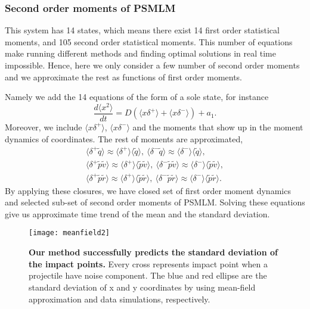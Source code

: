 \documentclass[letterpaper, 10 pt, conference]{ieeeconf}  %
\begin{document}
\subsubsection{Second order moments of PSMLM}
This system has 14 states, which means there exist 14 first order statistical moments, and 105 second order statistical moments. This number of equations make running different methods and finding optimal solutions in real time impossible. Hence, here we only consider a few number of second order moments and we approximate the rest as functions of first order moments. 

Namely we add the 14 equations of the form of a sole state, for instance
\begin{equation}
\frac{d \langle x^2 \rangle}{dt}= D ( \langle x \delta^+ \rangle + \langle x \delta^- \rangle ) + a_1.
\label{eqn:sec}
\end{equation}
Moreover, we include $\langle x \delta^+ \rangle$, $\langle x \delta^- \rangle$ and the moments that show up in the moment dynamics of coordinates. The rest of moments are approximated, 
\begin{gather}
\langle \delta^+ \tilde{q} 	\rangle \approx \langle \delta^+ \rangle \langle \tilde{q} 	\rangle,  ~ 
	\langle \delta^- \tilde{q} \rangle \approx \langle \delta^- \rangle \langle \tilde{q} \rangle, \\	 
	 \langle \delta^+ \tilde{p} \tilde{v} \rangle \approx \langle \delta^+ \rangle \langle \tilde{p} \tilde{v} \rangle, ~
\langle \delta^-  \tilde{p} \tilde{v} \rangle \approx \langle \delta^- \rangle \langle \tilde{p} \tilde{v} \rangle, \\ 	
\langle \delta^+ \tilde{p} \tilde{r}  \rangle \approx \langle \delta^+ \rangle \langle \tilde{p}  \tilde{r} \rangle,~ \langle \delta^- \tilde{p} \tilde{r} \rangle \approx \langle \delta^- \rangle \langle \tilde{p}  \tilde{r} \rangle.
\end{gather} 
By applying these closures, we have closed set of first order moment dynamics and selected sub-set of second order moments of PSMLM. Solving these equations give us approximate time trend of the mean and the standard deviation.

\begin{figure}[!t]
\centering
\texttt{[image: meanfield2]}
\caption{\textbf{Our method successfully predicts the standard deviation of the impact points.}
Every cross represents impact point when a projectile have noise component. The blue and red ellipse are  the standard deviation of x and y coordinates by using mean-field approximation and data simulations, respectively.}
\label{fig:1000ipp}
\end{figure}
\end{document}
